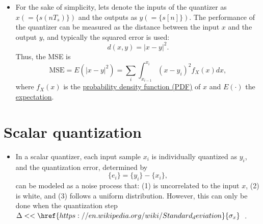 \begin{itemize}
\item For the sake of simplicity, lets denote the inputs of the
  quantizer as $x (=\{s(nT_s)\})$ and the outputs as $y
  (=\{s[n]\})$. The performance of the quantizer can be measured as the
  distance between the input $x$ and the output $y$, and typically the
  squared error is used:
  \begin{equation*}
    d(x,y) = |x-y|^2.
  \end{equation*}
  Thus, the MSE is
  \begin{equation}
    \text{MSE} = E(|x-y|^2)=\sum_i\int_{x_{i-1}}^{x_i} (x-y_i)^2f_X(x)dx,
  \end{equation}
  where $f_X(x)$ is the
  \href{https://en.wikipedia.org/wiki/Probability_density_function}{probability
    density function (PDF)} of $x$ and $E(\cdot)$ the
  \href{https://en.wikipedia.org/wiki/Expected_value}{expectation}.

\end{itemize}

\section{Scalar quantization}
\begin{itemize}
\item In a scalar quantizer, each input sample $x_i$ is individually
  quantized as $y_i$, and the quantization error, determined by
  \begin{equation*}
    \{e_i\}=\{y_i\}-\{x_i\},
  \end{equation*}
  can be modeled as a noise process that: (1) is uncorrelated to the
  input $x$, (2) is white, and (3) follows a uniform
  distribution. However, this can only be done when the quantization
  step
  $\Delta<<\href{https://en.wikipedia.org/wiki/Standard_deviation}{\sigma_x}$~\cite{vetterli1995wavelets}.

\end{itemize}

